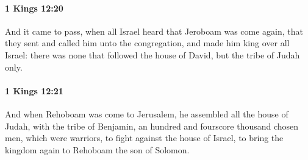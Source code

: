 		\paragraph{1 Kings 12:20} %
			\label{1KINGS-12-20}

			And it came to pass, when all Israel heard that Jeroboam was come again, that they sent and called him unto the congregation, and made him king over all Israel: there was none that followed the house of David, but the tribe of Judah only.


		\paragraph{1 Kings 12:21} %
			\label{1KINGS-12-21}

			And when Rehoboam was come to Jerusalem, he assembled all the house of Judah, with the tribe of Benjamin, an hundred and fourscore thousand chosen men, which were warriors, to fight against the house of Israel, to bring the kingdom again to Rehoboam the son of Solomon.

